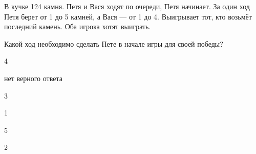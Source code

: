 
\begin{question}
В кучке 124 камня. Петя и Вася ходят по очереди, Петя начинает. За один
ход Петя берет от 1 до 5 камней, а Вася --- от 1 до 4. Выигрывает тот,
кто возьмёт последний камень. Оба игрока хотят выиграть.

Какой ход необходимо сделать Пете в начале игры для своей победы?
\begin{answerlist}
  \item 4
  \item нет верного ответа
  \item 3
  \item 1
  \item 5
  \item 2
\end{answerlist}
\end{question}


